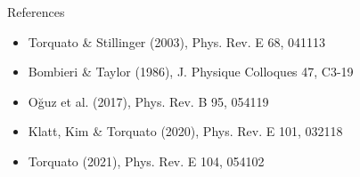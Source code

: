 \documentclass[aspectratio=169, 11pt]{beamer}
\begin{document}
\begin{frame}{References}

\small
\begin{itemize}
    \item Torquato \& Stillinger (2003), Phys. Rev. E 68, 041113
    \item Bombieri \& Taylor (1986), J. Physique Colloques 47, C3-19
    \item O\u{g}uz et al. (2017), Phys. Rev. B 95, 054119
    \item Klatt, Kim \& Torquato (2020), Phys. Rev. E 101, 032118
    \item Torquato (2021), Phys. Rev. E 104, 054102
\end{itemize}
\end{frame}
\note{

}
\end{document}
